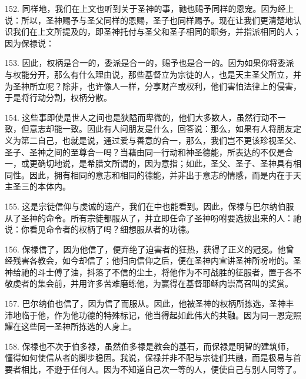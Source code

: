 152. 同样地，我们在上文也听到关于圣神的事，祂也赐予同样的恩宠。因为经上说：所以，圣神赐予与圣父同样的恩赐，圣子也同样赐予。现在让我们更清楚地认识我们在上文所提及的，即圣神托付与圣父和圣子相同的职务，并指派相同的人；因为保禄说：\par

153. 因此，权柄是合一的，委派是合一的，赐予也是合一的。因为如果你将委派与权能分开，那么有什么理由说，那些基督立为宗徒的人，也是天主圣父所立，并为圣神所立呢？除非，也许像人一样，分享财产或权利，他们害怕法律上的侵害，于是将行动分割，权柄分散。\par

154. 这些事即使是世人之间也是狭隘而卑微的，他们大多数人，虽然行动不一致，但意志却能一致。因此有人问朋友是什么，回答说：那么，如果有人将朋友定义为第二自己，也就是说，通过爱与善意的合一，那么，我们岂不更该珍视圣父、圣子、圣神之间的至尊合一吗？当藉由同一行动和神圣德能，所表达的不仅是合一，或更确切地说，是希腊文所谓的，因为意指；如此，圣父、圣子、圣神具有相同性。因此，拥有相同的意志和相同的德能，并非出于意志的情感，而是内在于天主圣三的本体内。\par

155. 这是宗徒信仰与虔诚的遗产，我们在中也能看到。因此，保禄与巴尔纳伯服从了圣神的命令。所有宗徒都服从了，并立即任命了圣神吩咐要选拔出来的人：祂说：你看见命令者的权柄了吗？细想服从者的功德。\par

156. 保禄信了，因为他信了，便弃绝了迫害者的狂热，获得了正义的冠冕。他曾经残害各教会，如今却信了；他归向信仰之后，便在圣神内宣讲圣神所吩咐的。圣神给祂的斗士傅了油，抖落了不信的尘土，将他作为不可战胜的征服者，置于各不敬虔者的集会前，并用许多苦难磨练他，为赢得在基督耶稣内崇高召叫的奖赏。\par

157. 巴尔纳伯也信了，因为信了而服从。因此，他被圣神的权柄所拣选，圣神丰沛地临于他，作为他功德的特殊标记，他当得起如此伟大的共融。因为同一恩宠照耀在这些同一圣神所拣选的人身上。\par

158. 保禄也不次于伯多禄，虽然伯多禄是教会的基石，而保禄是明智的建筑师，懂得如何使信从者的脚步稳固。我说，保禄并非不配与宗徒们共融，而是极易与首要者相比，不逊于任何人。因为不知道自己次一等的人，便使自己与别人同等了。\par

